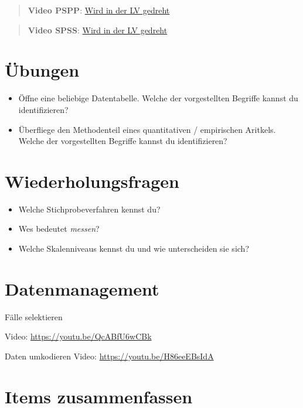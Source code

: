 \documentclass[
]{book}
\providecommand{\tightlist}{%
  \setlength{\itemsep}{0pt}\setlength{\parskip}{0pt}}
\begin{document}
\begin{quote}
\textbf{Video PSPP}: \href{TBA}{Wird in der LV gedreht}
\end{quote}

\begin{quote}
\textbf{Video SPSS}: \href{TBA}{Wird in der LV gedreht}
\end{quote}

\hypertarget{uxfcbungen}{%
\section{Übungen}\label{uxfcbungen}}

\begin{itemize}
\tightlist
\item
  Öffne eine beliebige Datentabelle. Welche der vorgestellten Begriffe kannst du identifizieren?
\item
  Überfliege den Methodenteil eines quantitativen / empirischen Aritkels. Welche der vorgestellten Begriffe kannst du identifizieren?
\end{itemize}

\hypertarget{wiederholungsfragen-1}{%
\section{Wiederholungsfragen}\label{wiederholungsfragen-1}}

\begin{itemize}
\tightlist
\item
  Welche Stichprobeverfahren kennst du?
\item
  Wes bedeutet \emph{messen}?
\item
  Welche Skalenniveaus kennst du und wie unterscheiden sie sich?
\end{itemize}

\hypertarget{datenmanagement}{%
\section{Datenmanagement}\label{datenmanagement}}

Fälle selektieren

Video: \url{https://youtu.be/QcABfU6wCBk}

Daten umkodieren
Video: \url{https://youtu.be/H86eeEBsIdA}

\hypertarget{items-zusammenfassen}{%
\section{Items zusammenfassen}\label{items-zusammenfassen}}
\end{document}
